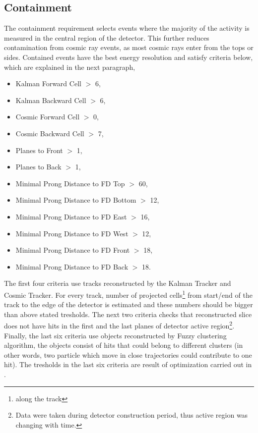 \subsection{Containment} \label{Containment}
The containment requirement selects events where the majority of the activity is
measured in the central region of the detector. This further reduces contamination from cosmic 
ray events, as most cosmic rays enter from the tops or sides.  Contained events have the best 
energy resolution and satisfy criteria below, which are explained in the next paragraph,

\begin{itemize}
\item Kalman Forward Cell $>$ 6,
\item Kalman Backward Cell $>$ 6,
\item Cosmic Forward Cell $>$ 0,
\item Cosmic Backward Cell $>$ 7,
\item Planes to Front $>$ 1,
\item Planes to Back $>$ 1,
\item Minimal Prong Distance to FD Top $>$ 60,
\item Minimal Prong Distance to FD Bottom $>$ 12,
\item Minimal Prong Distance to FD East $>$ 16,
\item Minimal Prong Distance to FD West $>$ 12,
\item Minimal Prong Distance to FD Front $>$ 18,
\item Minimal Prong Distance to FD Back $>$ 18.
\end{itemize}
The first four criteria use tracks reconstructed by the Kalman Tracker and Cosmic Tracker.
For every track, number of projected cells\footnote{along the track} from start/end of the track 
to the edge of the detector is estimated and these numbers should be bigger than above stated
tresholds. The next two criteria checks that reconstructed slice does not have hits in the first
and the last planes of detector active region\footnote{Data were taken during detector construction
period, thus active region was changing with time.}. Finally, the last six criteria use objects
reconstructed by Fuzzy clustering algorithm, the objects consist of hits that could belong to 
different clusters (in other words, two particle which move in close trajectories could contribute
to one hit). The tresholds in the last six criteria are result of optimization carried out in 
\cite{numucont_technote}.

